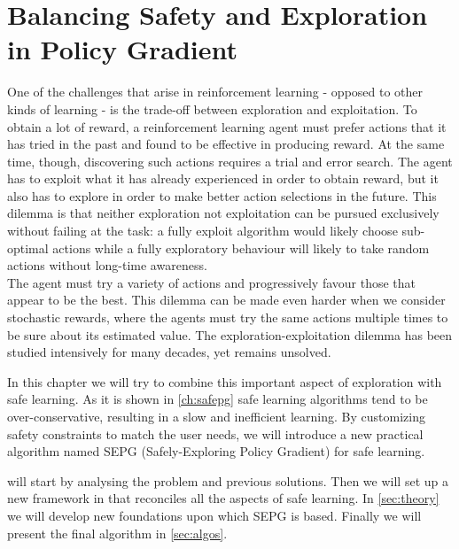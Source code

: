 \chapter{Balancing Safety and Exploration in Policy Gradient}
\label{ch:balance}
\thispagestyle{empty}

\fancyhead[LE,RO]{\bfseries\thepage}                               
\fancyhead[LO]{\bfseries\rightmark}  


One of the challenges that arise in reinforcement learning - opposed to other kinds of learning - is the trade-off between exploration and exploitation. To obtain a lot of reward, a reinforcement learning agent must prefer actions that it has tried in the past and found to be effective in producing reward. At the same time, though, discovering such actions requires a trial and error search. The agent has to exploit what it has already experienced in order to obtain reward, but it also has to explore in order to make better action selections in the future. This dilemma is that neither exploration not exploitation can be pursued exclusively without failing at the task: a fully exploit algorithm would likely choose sub-optimal actions while a fully exploratory behaviour will likely to take random actions without long-time awareness.\\
The agent must try a variety of actions and progressively favour those that appear to be the best. This dilemma can be made even harder when we consider stochastic rewards, where the agents must try the same actions multiple times to be sure about its estimated value. The exploration-exploitation dilemma has been studied intensively for many decades, yet remains unsolved. 

In this chapter we will try to combine this important aspect of exploration with safe learning. As it is shown in \ref{ch:safepg} safe learning algorithms tend to be over-conservative, resulting in a slow and inefficient learning. By customizing safety constraints to match the user needs, we will introduce a new practical algorithm named SEPG (Safely-Exploring Policy Gradient) for safe learning. 

 will start by analysing the problem and previous solutions. Then we will set up a new framework in  that reconciles all the aspects of safe learning. In \ref{sec:theory} we will develop new foundations upon which SEPG is based. Finally we will present the final algorithm in \ref{sec:algos}.



